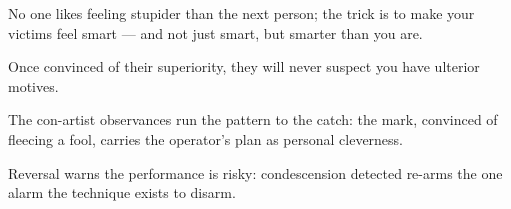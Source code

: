 

\begin{distilled}
  \item No one likes feeling stupider than the next person; the trick is to make your victims feel smart --- and not just smart, but smarter than you are.
  \item Once convinced of their superiority, they will never suspect you have ulterior motives.
  \item The con-artist observances run the pattern to the catch: the mark, convinced of fleecing a fool, carries the operator's plan as personal cleverness.
  \item Reversal warns the performance is risky: condescension detected re-arms the one alarm the technique exists to disarm.
\end{distilled}
